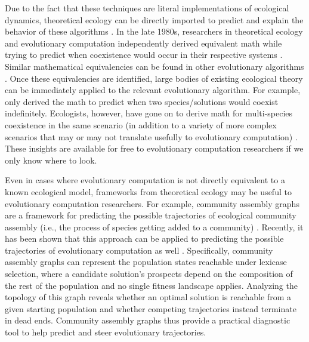 Due to the fact that these techniques are literal implementations of ecological dynamics, theoretical ecology can be directly imported to predict and explain the behavior of these algorithms \citep{dolson2018ecological}.
In the late 1980s, researchers in theoretical ecology \citep{chesson1990macarthur} and evolutionary computation \citep{deb1989investigation} independently derived equivalent math while trying to predict when coexistence would occur in their respective systems \citep{dolson2018ecological}.
Similar mathematical equivalencies can be found in other evolutionary algorithms \citep{dolson2018ecological}.
Once these equivalencies are identified, large bodies of existing ecological theory can be immediately applied to the relevant evolutionary algorithm.
For example, \citet{deb1989investigation} only derived the math to predict when two species/solutions would coexist indefinitely.
Ecologists, however, have gone on to derive math for multi-species coexistence in the same scenario (in addition to a variety of more complex scenarios that may or may not translate usefully to evolutionary computation) \citep{barabas2016multispecies,saavedra2017structural,chesson2000mechanisms}.
These insights are available for free to evolutionary computation researchers if we only know where to look.

Even in cases where evolutionary computation is not directly equivalent to a known ecological model, frameworks from theoretical ecology may be useful to evolutionary computation researchers.
For example, community assembly graphs are a framework for predicting the possible trajectories of ecological community assembly (i.e., the process of species getting added to a community) \citep{hangkwang1993assembly,servan2021tractable}.
Recently, it has been shown that this approach can be applied to predicting the possible trajectories of evolutionary computation as well \citep{dolson2024reachability}.
Specifically, community assembly graphs can represent the population states reachable under lexicase selection, where a candidate solution's prospects depend on the composition of the rest of the population and no single fitness landscape applies.
Analyzing the topology of this graph reveals whether an optimal solution is reachable from a given starting population and whether competing trajectories instead terminate in dead ends.
Community assembly graphs thus provide a practical diagnostic tool to help predict and steer evolutionary trajectories.

